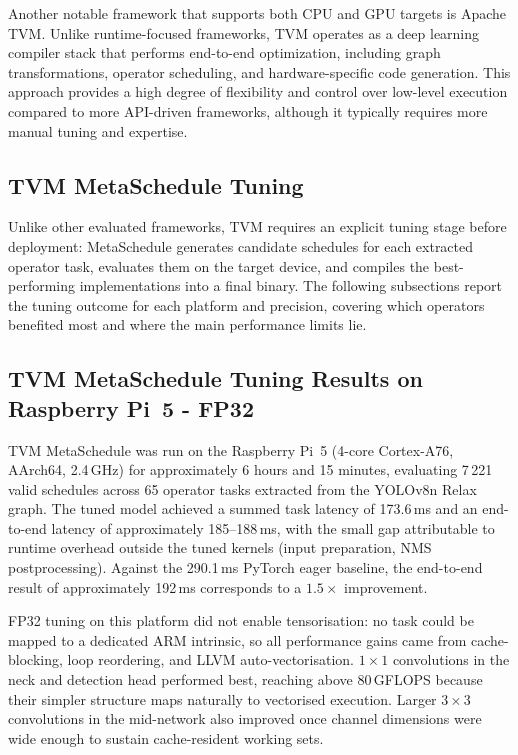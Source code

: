 \documentclass[12pt,a4paper]{report}
\begin{document}
Another notable framework that supports both CPU and GPU targets is Apache TVM. Unlike runtime-focused frameworks,
TVM operates as a deep learning compiler stack that performs end-to-end optimization, including graph
transformations, operator scheduling, and hardware-specific code generation. This approach provides a
high degree of flexibility and control over low-level execution compared to more API-driven frameworks,
although it typically requires more manual tuning and expertise.

\subsection{TVM MetaSchedule Tuning}

Unlike other evaluated frameworks, TVM requires an explicit tuning stage before deployment: MetaSchedule generates
candidate schedules for each extracted operator task, evaluates them on the target device, and compiles the
best-performing implementations into a final binary.
The following subsections report the tuning outcome for each platform and precision, covering which operators
benefited most and where the main performance limits lie.

\subsection{TVM MetaSchedule Tuning Results on Raspberry Pi~5 - FP32}

TVM MetaSchedule was run on the Raspberry Pi~5 (4-core Cortex-A76, AArch64, 2.4\,GHz) for approximately
6 hours and 15 minutes, evaluating 7\,221 valid schedules across 65 operator tasks extracted from the
YOLOv8n Relax graph.
The tuned model achieved a summed task latency of 173.6\,ms and an end-to-end latency of approximately
185--188\,ms, with the small gap attributable to runtime overhead outside the tuned kernels (input
preparation, NMS postprocessing).
Against the 290.1\,ms PyTorch eager baseline, the end-to-end result of approximately 192\,ms corresponds
to a $1.5\times$ improvement.

FP32 tuning on this platform did not enable tensorisation: no task could be mapped to a dedicated ARM
intrinsic, so all performance gains came from cache-blocking, loop reordering, and LLVM auto-vectorisation.
$1{\times}1$ convolutions in the neck and detection head performed best, reaching above 80\,GFLOPS because
their simpler structure maps naturally to vectorised execution.
Larger $3{\times}3$ convolutions in the mid-network also improved once channel dimensions were wide enough
to sustain cache-resident working sets.
\end{document}
